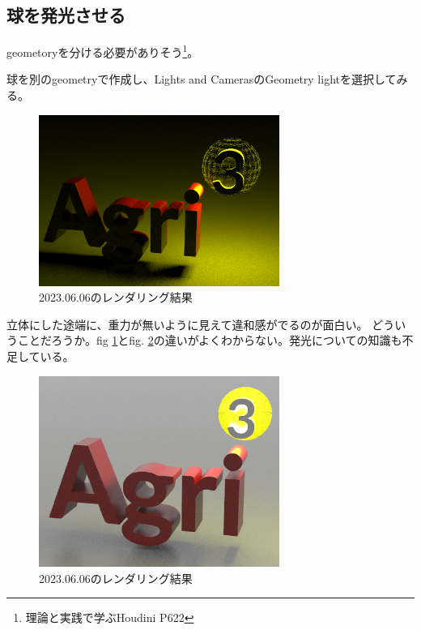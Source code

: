 \documentclass[uplatex,dvipdfmx]{jsarticle}
\begin{document}
\subsection{球を発光させる}
geometoryを分ける必要がありそう\footnote{理論と実践で学ぶHoudini P622}。

球を別のgeometryで作成し、Lights and CamerasのGeometry lightを選択してみる。

\begin{figure}[h]
  \centering
  \includegraphics[width=0.7\textwidth]{figs/fig_light_3.PNG}
  \caption{2023.06.06のレンダリング結果}
  \label{fig:rendered_230606_2}
\end{figure}


立体にした途端に、重力が無いように見えて違和感がでるのが面白い。
どういうことだろうか。fig \ref{fig:rendered_230606_2}とfig. \ref{fig:rendered_230606_3}の違いがよくわからない。発光についての知識も不足している。

\begin{figure}[h]
  \centering
  \includegraphics[width=0.7\textwidth]{figs/fig_light_4.PNG}
  \caption{2023.06.06のレンダリング結果}
  \label{fig:rendered_230606_3}
\end{figure}

\printbibliography
\end{document}
